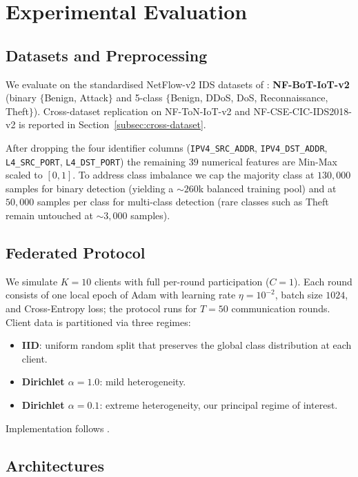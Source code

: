 \section{Experimental Evaluation}\label{sec:experiments}

\subsection{Datasets and Preprocessing}

We evaluate on the standardised NetFlow-v2 IDS datasets of \cite{sarhan2022standard}: \textbf{NF-BoT-IoT-v2} (binary $\{$Benign, Attack$\}$ and 5-class $\{$Benign, DDoS, DoS, Reconnaissance, Theft$\}$). Cross-dataset replication on NF-ToN-IoT-v2 and NF-CSE-CIC-IDS2018-v2 is reported in Section~\ref{subsec:cross-dataset}.

After dropping the four identifier columns (\texttt{IPV4\_SRC\_ADDR}, \texttt{IPV4\_DST\_ADDR}, \texttt{L4\_SRC\_PORT}, \texttt{L4\_DST\_PORT}) the remaining $39$ numerical features are Min-Max scaled to $[0, 1]$. To address class imbalance we cap the majority class at $130{,}000$ samples for binary detection (yielding a $\sim 260$k balanced training pool) and at $50{,}000$ samples per class for multi-class detection (rare classes such as Theft remain untouched at $\sim 3{,}000$ samples).

\subsection{Federated Protocol}

We simulate $K = 10$ clients with full per-round participation ($C = 1$). Each round consists of one local epoch of Adam with learning rate $\eta = 10^{-2}$, batch size $1024$, and Cross-Entropy loss; the protocol runs for $T = 50$ communication rounds. Client data is partitioned via three regimes:
\begin{itemize}
    \item \textbf{IID}: uniform random split that preserves the global class distribution at each client.
    \item \textbf{Dirichlet $\alpha = 1.0$}: mild heterogeneity.
    \item \textbf{Dirichlet $\alpha = 0.1$}: extreme heterogeneity, our principal regime of interest.
\end{itemize}
Implementation follows \cite{hsu2019measuring}.

\subsection{Architectures}

